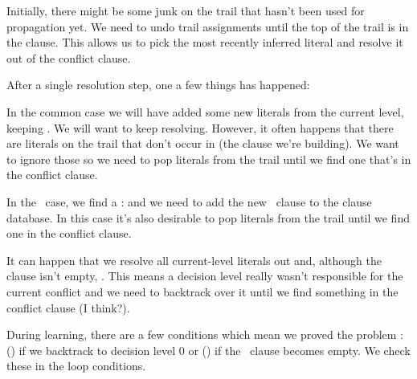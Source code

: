 Initially, there might be some junk on the trail that hasn't been used
for
propagation yet. We need to undo trail assignments until the top of the trail
is
in the clause. This allows us to pick the most recently inferred literal and
resolve it out of the conflict clause.

After a single resolution step, one a few things has happened:

\orderedlist

\li In the common case we will have added some new literals from the current
level, keeping . We will want to keep resolving. However, it
often happens
that there are literals on the trail that don't occur in  (the
clause we're building). We want to ignore those so we need to pop literals from
the trail until we find one that's in the conflict clause.

\li In the \UIP\ case, we find a \UIP:  and we need to add the
new \UIP\ clause
to the clause database. In this case it's also desirable to pop literals from
the trail until we find one in the conflict clause.

\li It can happen that we resolve all current-level literals out and, although
the clause isn't empty, . This means a decision level really
wasn't
responsible for the current conflict and we need to backtrack over it until
we find something in the conflict clause (I think?).

\endorderedlist

During learning, there are a few conditions which mean we proved the problem
\UNSAT: () if we backtrack to decision level 0 or () if the \UIP\
clause becomes empty. We check these in the loop conditions.

